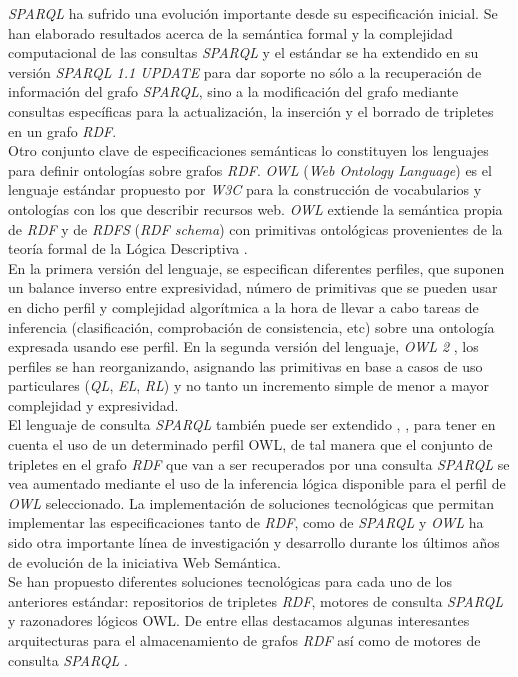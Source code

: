 \textit{SPARQL} ha sufrido una evoluci\'on importante desde su especificaci\'on inicial. Se han elaborado resultados acerca de la sem\'antica formal y la complejidad computacional de las consultas \textit{SPARQL} \cite{perez2006semantics} y el est\'andar se ha extendido en su versi\'on \textit{SPARQL 1.1 UPDATE} \cite{sparql11} para dar soporte no s\'olo a la recuperaci\'on de informaci\'on del grafo \textit{SPARQL}, sino a la modificaci\'on del grafo mediante consultas espec\'ificas para la actualizaci\'on, la inserci\'on y el borrado de tripletes en un grafo \textit{RDF}.\\
Otro conjunto clave de especificaciones sem\'anticas lo constituyen los lenguajes para definir ontolog\'ias sobre grafos \textit{RDF}. \textit{OWL} (\textit{Web Ontology Language}) \cite{owl} es el lenguaje est\'andar propuesto por \textit{W3C} para la construcci\'on de vocabularios y ontolog\'ias con los que describir recursos web. \textit{OWL} extiende la sem\'antica propia de \textit{RDF} y de \textit{RDFS} (\textit{RDF schema}) \cite{rdfs} con primitivas ontol\'ogicas provenientes de la teor\'ia formal de la L\'ogica Descriptiva \cite{owl_dl_reduction}.\\
En la primera versi\'on del lenguaje, se especifican diferentes perfiles, que suponen un balance inverso entre expresividad, n\'umero de primitivas que se pueden usar en dicho perfil y complejidad algor\'itmica a la hora de llevar a cabo tareas de inferencia (clasificaci\'on, comprobaci\'on de consistencia, etc) sobre una ontolog\'ia expresada usando ese perfil. En la segunda versi\'on del lenguaje, \textit{OWL 2} \cite{owl2}, los perfiles se han reorganizando, asignando las primitivas en base a casos de uso particulares (\textit{QL}, \textit{EL}, \textit{RL}) \cite{owl2_profiles} y no tanto un incremento simple de menor a mayor complejidad y expresividad.\\
El lenguaje de consulta \textit{SPARQL} tambi\'en puede ser extendido \cite{sirin2007sparql}, \cite{glimm2009sparql}, para tener en cuenta el uso de un determinado perfil OWL, de tal manera que el conjunto de tripletes en el grafo \textit{RDF} que van a ser recuperados por una consulta \textit{SPARQL} se vea aumentado mediante el uso de la inferencia l\'ogica disponible para el perfil de \textit{OWL} seleccionado.
La implementaci\'on de soluciones tecnol\'ogicas que permitan implementar las especificaciones tanto de \textit{RDF}, como de \textit{SPARQL} y \textit{OWL} ha sido otra importante l\'inea de investigaci\'on y desarrollo durante los \'ultimos a\~nos de evoluci\'on de la iniciativa Web Sem\'antica.\\
Se han propuesto diferentes soluciones tecnol\'ogicas para cada uno de los anteriores est\'andar: repositorios de tripletes \textit{RDF}, motores de consulta \textit{SPARQL} y razonadores l\'ogicos OWL. De entre ellas destacamos algunas interesantes arquitecturas para el almacenamiento de grafos \textit{RDF} as\'i como de motores de consulta \textit{SPARQL} \cite{yars} \cite{rohloff2010high}.\\

